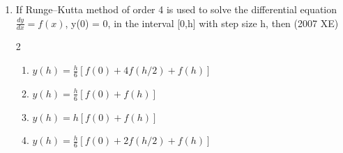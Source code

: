 \begin{enumerate}[label=\thesubsection.\arabic*,ref=\thesubsection.\theenumi]
    \hfill{(2007 XE)}
    \begin{multicols}{2}
    \begin{enumerate}
        \item $ x_{n+1}=\frac{x_n\,g'(x_n)-g(x_n)}{1-g'(x_n)} $
        \item $ x_{n+1}=\frac{x_n,g'(x_n)-g(x_n)}{g'(x_n)-1} $
        \item $ x_{n+1}=g(x_n) $
        \item $ x_{n+1}=\frac{x_n,g'(x_n)-g(x_n)+2x_n}{g'(x_n)+1} $
    \end{enumerate}
\end{multicols}
    \item If Runge–Kutta method of order 4 is used to solve the differential equation $\frac{dy}{dx} = f(x)$, y(0) = 0, in the interval [0,h] with step size h, then
    \hfill{(2007 XE)}
    \begin{multicols}{2}
    \begin{enumerate}
        \item $y(h) = \frac{h}{6} [f(0) + 4f(h/2) + f(h)]$
        \vspace{0.1cm}
        \item $y(h) = \frac{h}{6} [f(0) + f(h)]$
        \item $y(h) = h [f(0) + f(h)]$
        \item $y(h) = \frac{h}{6} [f(0) + 2f(h/2) + f(h)]$
    \end{enumerate}
\end{multicols}


\end{enumerate}
